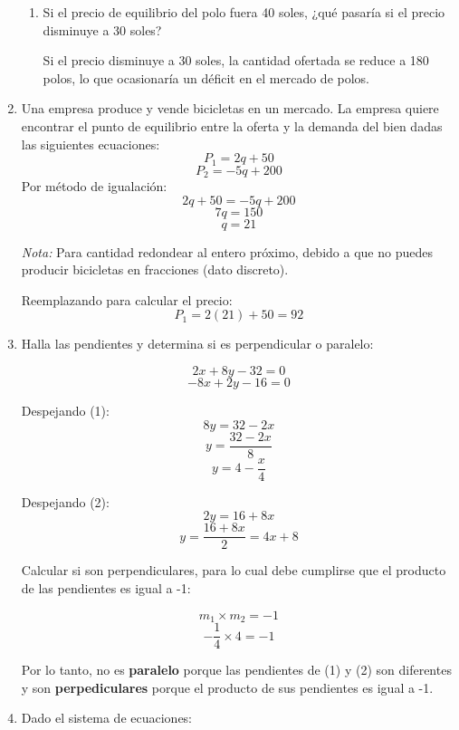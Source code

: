 \documentclass[12pt,a4paper]{article}
\begin{document}
\begin{enumerate}
\begin{enumerate}
        \item Si el precio de equilibrio del polo fuera 40 soles, ¿qué pasaría si el precio disminuye a 30 soles?
        
        Si el precio disminuye a 30 soles, la cantidad ofertada se reduce a 180 polos, lo que ocasionaría un déficit en el mercado de polos.
    \end{enumerate}
    
    \item Una empresa produce y vende bicicletas en un mercado. La empresa quiere encontrar el punto de equilibrio entre la oferta y la demanda del bien dadas las siguientes ecuaciones:
    \[
    P_1 = 2q + 50
    \]
    \[
    P_2 = -5q + 200
    \]
    Por método de igualación:
    \[
    2q + 50 = -5q + 200
    \]
    \[
    7q = 150
    \]
    \[
    q = 21
    \]
    
    \noindent\textit{Nota:} Para cantidad redondear al entero próximo, debido a que no puedes producir bicicletas en fracciones (dato discreto).
    
    Reemplazando para calcular el precio:
    \[
    P_1 = 2(21) + 50 = 92
    \]

    \item 
    Halla las pendientes y determina si es perpendicular o paralelo:
    \begin{multicols}{2}
        
    \[
    2x + 8y - 32 = 0 \tag{1}
    \]
    \[
    -8x + 2y - 16 = 0 \tag{2}
    \]
    
    Despejando (1):
    \[
    8y = 32 - 2x
    \]
    \[
    y = \frac{32 - 2x}{8}
    \]
    \[
    y = 4 - \frac{x}{4}
    \]
    
    Despejando (2):
    \[
    2y = 16 + 8x
    \]
    \[
    y = \frac{16 + 8x}{2} = 4x + 8
    \]

    Calcular si son perpendiculares, para lo cual debe cumplirse que el producto de las pendientes es igual a -1:

    \[ m_1 \times m_2 = -1 \]
    \[ -\frac{1}{4} \times 4 = -1 \]
    
    \end{multicols}
    
    Por lo tanto, no es \textbf{paralelo} porque las pendientes de (1) y (2) son diferentes y son \textbf{perpediculares} porque el producto de sus pendientes es igual a -1.
    
    \item Dado el sistema de ecuaciones:
    \begin{multicols}{2}
        

\end{multicols}
\end{enumerate}
\end{document}
